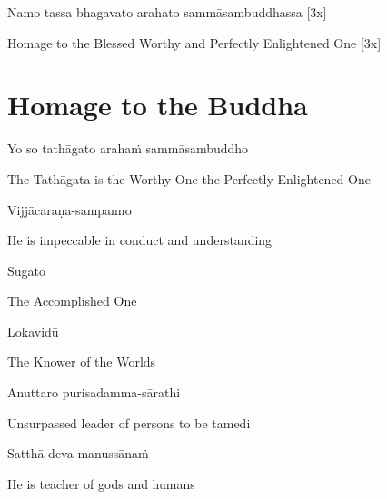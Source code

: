 \begin{leader}
\end{leader}

Namo tassa bhagavato arahato sammāsambuddhassa [3x]

\begin{cprenglish}
  Homage to the Blessed Worthy and Perfectly Enlightened One [3x]
\end{cprenglish}

\clearpage

\section{Homage to the Buddha}

\begin{leader}
\end{leader}
\begin{leader}
\end{leader}

Yo so tathāgato arahaṁ sammāsambuddho

\begin{cprenglish}
  The Tathāgata is the Worthy One the Perfectly Enlightened One
\end{cprenglish}

Vijjācaraṇa-sampanno

\begin{cprenglish}
  He is impeccable in conduct and understanding
\end{cprenglish}

Sugato

\begin{cprenglish}
  The Accomplished One
\end{cprenglish}

Lokavidū

\begin{cprenglish}
  The Knower of the Worlds
\end{cprenglish}

Anuttaro purisadamma-sārathi

\begin{cprenglish}
  Unsurpassed leader of persons to be tamedi
\end{cprenglish}

Satthā deva-manussānaṁ

\begin{cprenglish}
  He is teacher of gods and humans
\end{cprenglish}

